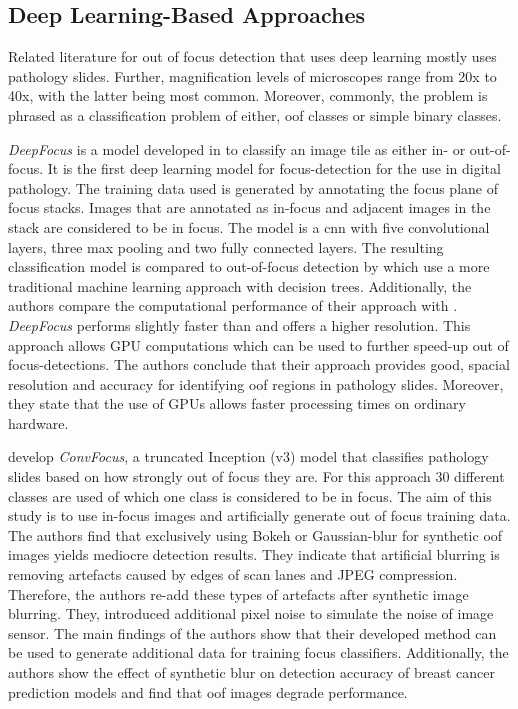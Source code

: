 
\subsection{Deep Learning-Based Approaches}
\label{sec:Foundations:RelatedWorks:DeepLearning}

Related literature for out of focus detection that uses deep learning mostly uses pathology slides. Further, magnification levels of microscopes range from 20x to 40x, with the latter being most common. Moreover, commonly, the problem is phrased as a classification problem of either, \ac{oof} classes or simple binary classes.

\emph{DeepFocus} is a model developed in \textcite{senaras2018deepfocus} to classify an image tile as either in- or out-of-focus. It is the first deep learning model for focus-detection for the use in digital pathology. The training data used is generated by annotating the focus plane of focus stacks. Images that are annotated as in-focus and adjacent images in the stack are considered to be in focus. The model is a \ac{cnn} with five convolutional layers, three max pooling and two fully connected layers. The resulting classification model is compared to out-of-focus detection by \textcite{moleslopez2013automated} which use a more traditional machine learning approach with decision trees.
Additionally, the authors compare the computational performance of their approach with \textcite{moleslopez2013automated}. \emph{DeepFocus} performs slightly faster than \textcite{moleslopez2013automated} and offers a higher resolution. This approach allows GPU computations which can be used to further speed-up out of focus-detections.
The authors conclude that their approach provides good, spacial resolution and accuracy for identifying \ac{oof} regions in pathology slides. Moreover, they state that the use of GPUs allows faster processing times on ordinary hardware.

\textcite{kohlberger2019wholeslide} develop \emph{ConvFocus}, a truncated Inception (v3) model that classifies pathology slides based on how strongly out of focus they are. For this approach 30 different classes are used of which one class is considered to be in focus. The aim of this study is to use in-focus images and artificially generate out of focus training data.
The authors find that exclusively using Bokeh or Gaussian-blur for synthetic \ac{oof} images yields mediocre detection results. They indicate that artificial blurring is removing artefacts caused by edges of scan lanes and JPEG compression. Therefore, the authors re-add these types of artefacts after synthetic image blurring. They, introduced additional pixel noise to simulate the noise of image sensor.
The main findings of the authors show that their developed method can be used to generate additional data for training focus classifiers. Additionally, the authors show the effect of synthetic blur on detection accuracy of breast cancer prediction models and find that \ac{oof} images degrade performance.

